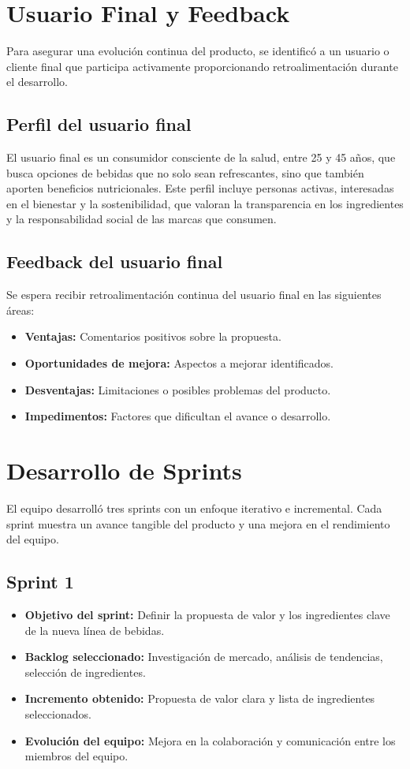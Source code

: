 \documentclass{article}
\begin{document}
\section{Usuario Final y Feedback}
Para asegurar una evolución continua del producto, se identificó a un usuario o cliente final que participa activamente proporcionando retroalimentación durante el desarrollo.


\subsection{Perfil del usuario final}
El usuario final es un consumidor consciente de la salud, entre 25 y 45 años, que busca opciones de bebidas que no solo sean refrescantes, sino que también aporten beneficios nutricionales. Este perfil incluye personas activas, interesadas en el bienestar y la sostenibilidad, que valoran la transparencia en los ingredientes y la responsabilidad social de las marcas que consumen.


\subsection{Feedback del usuario final}
Se espera recibir retroalimentación continua del usuario final en las siguientes áreas:


\begin{itemize}
\item \textbf{Ventajas:} Comentarios positivos sobre la propuesta.
\item \textbf{Oportunidades de mejora:} Aspectos a mejorar identificados.
\item \textbf{Desventajas:} Limitaciones o posibles problemas del producto.
\item \textbf{Impedimentos:} Factores que dificultan el avance o desarrollo.
\end{itemize}


\section{Desarrollo de Sprints}
El equipo desarrolló tres sprints con un enfoque iterativo e incremental. Cada sprint muestra un avance tangible del producto y una mejora en el rendimiento del equipo.


\subsection{Sprint 1}
\begin{itemize}
\item \textbf{Objetivo del sprint:} Definir la propuesta de valor y los ingredientes clave de la nueva línea de bebidas.
\item \textbf{Backlog seleccionado:} Investigación de mercado, análisis de tendencias, selección de ingredientes.
\item \textbf{Incremento obtenido:} Propuesta de valor clara y lista de ingredientes seleccionados.
\item \textbf{Evolución del equipo:} Mejora en la colaboración y comunicación entre los miembros del equipo.
\end{itemize}
\end{document}
